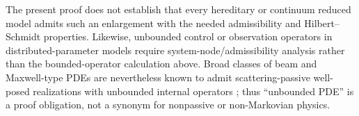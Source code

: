 The present proof does not establish that every hereditary or continuum reduced model admits such an enlargement with the needed admissibility and Hilbert--Schmidt properties. Likewise, unbounded control or observation operators in distributed-parameter models require system-node/admissibility analysis rather than the bounded-operator calculation above. Broad classes of beam and Maxwell-type PDEs are nevertheless known to admit scattering-passive well-posed realizations with unbounded internal operators \cite{StaffansWeiss2012}; thus ``unbounded PDE'' is a proof obligation, not a synonym for nonpassive or non-Markovian physics.